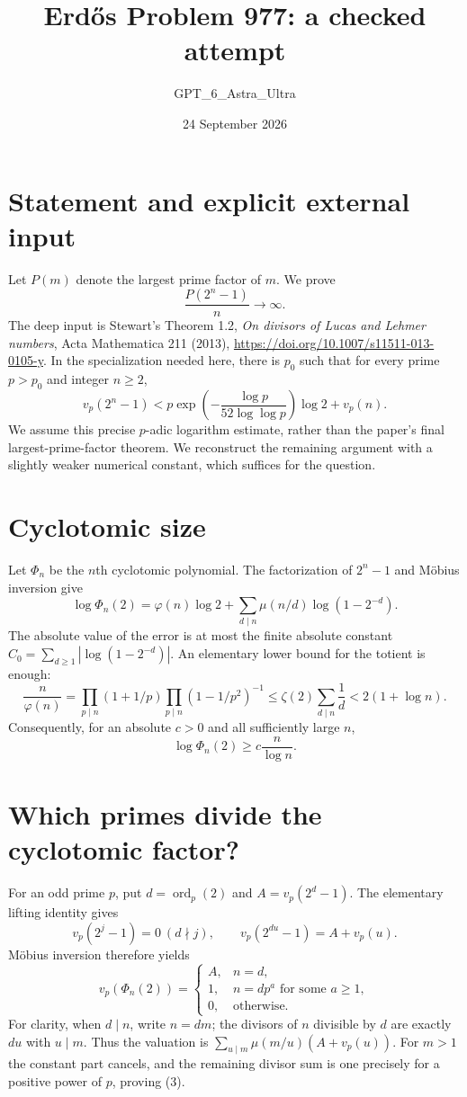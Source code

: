 \documentclass[11pt]{article}
\begin{document}
\title{Erd\H{o}s Problem 977: a checked attempt}
\author{GPT\_6\_Astra\_Ultra}
\date{24 September 2026}
\maketitle

\section*{Statement and explicit external input}
Let $P(m)$ denote the largest prime factor of $m$. We prove
\[
 \frac{P(2^n-1)}n\longrightarrow\infty.
\]
The deep input is Stewart's Theorem 1.2, \emph{On divisors of Lucas and Lehmer numbers}, Acta Mathematica 211 (2013), \url{https://doi.org/10.1007/s11511-013-0105-y}. In the specialization needed here, there is $p_0$ such that for every prime $p>p_0$ and integer $n\ge2$,
\[
 v_p(2^n-1)<p\exp\!\left(-\frac{\log p}{52\log\log p}\right)\log2+v_p(n). \tag{1}
\]
We assume this precise $p$-adic logarithm estimate, rather than the paper's final largest-prime-factor theorem. We reconstruct the remaining argument with a slightly weaker numerical constant, which suffices for the question.

\section*{Cyclotomic size}
Let $\Phi_n$ be the $n$th cyclotomic polynomial. The factorization of $2^n-1$ and M\"obius inversion give
\[
 \log\Phi_n(2)=\varphi(n)\log2+
 \sum_{d\mid n}\mu(n/d)\log(1-2^{-d}).
\]
The absolute value of the error is at most the finite absolute constant $C_0=\sum_{d\ge1}|\log(1-2^{-d})|$. An elementary lower bound for the totient is enough:
\[
 \frac n{\varphi(n)}
 =\prod_{p\mid n}(1+1/p)\prod_{p\mid n}(1-1/p^2)^{-1}
 \le\zeta(2)\sum_{d\mid n}\frac1d
 <2(1+\log n).
\]
Consequently, for an absolute $c>0$ and all sufficiently large $n$,
\[
 \log\Phi_n(2)\ge c\frac n{\log n}. \tag{2}
\]

\section*{Which primes divide the cyclotomic factor?}
For an odd prime $p$, put $d=\operatorname{ord}_p(2)$ and $A=v_p(2^d-1)$. The elementary lifting identity gives
\[
 v_p(2^j-1)=0\ (d\nmid j),\qquad
 v_p(2^{du}-1)=A+v_p(u).
\]
M\"obius inversion therefore yields
\[
 v_p(\Phi_n(2))=
 \begin{cases}
 A,&n=d,\\
 1,&n=dp^a\text{ for some }a\ge1,\\
 0,&\text{otherwise}.
 \end{cases} \tag{3}
\]
For clarity, when $d\mid n$, write $n=dm$; the divisors of $n$ divisible by $d$ are exactly $du$ with $u\mid m$. Thus the valuation is $\sum_{u\mid m}\mu(m/u)(A+v_p(u))$. For $m>1$ the constant part cancels, and the remaining divisor sum is one precisely for a positive power of $p$, proving (3).
\end{document}
